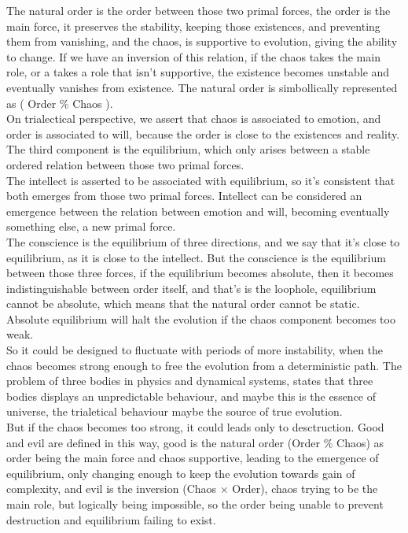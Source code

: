 \documentclass[12pt,a4paper]{article}
\begin{document}
The natural order is the order between those two primal forces, the order is the main force, it preserves the stability, keeping those existences, and preventing them from vanishing, and the chaos, is supportive to evolution, giving the ability to change. If we have an inversion of this relation, if the chaos takes the main role, or a takes a role that isn't supportive, the existence becomes unstable and eventually vanishes from existence. The natural order is simbollically represented as ( Order \% Chaos ). \\

On trialectical perspective, we assert that chaos is associated to emotion, and order is associated to will, because the order is close to the existences and reality. The third component is the equilibrium, which only arises between a stable ordered relation between those two primal forces. \\

The intellect is asserted to be associated with equilibrium, so it's consistent that both emerges from those two primal forces. Intellect can be considered an emergence between the relation between emotion and will, becoming eventually something else, a new primal force.\\

The conscience is the equilibrium of three directions, and we say that it's close to equilibrium, as it is close to the intellect. But the conscience is the equilibrium between those three forces, if the equilibrium becomes absolute, then it becomes indistinguishable between order itself, and that's is the loophole, equilibrium cannot be absolute, which means that the natural order cannot be static. Absolute equilibrium will halt the evolution if the chaos component becomes too weak. \\ 

So it could be designed to fluctuate with periods of more instability, when the chaos becomes strong enough to free the evolution from a deterministic path. The problem of three bodies in physics and dynamical systems, states that three bodies displays an unpredictable behaviour, and maybe this is the essence of universe, the trialetical behaviour maybe the source of true evolution.\\

But if the chaos becomes too strong, it could leads only to desctruction. Good and evil are defined in this way, good is the natural order (Order \% Chaos) as order being the main force and chaos supportive, leading to the emergence of equilibrium, only changing enough to keep the evolution towards gain of complexity, and evil is the inversion (Chaos $\times$ Order), chaos trying to be the main role, but logically being impossible, so the order being unable to prevent destruction and equilibrium failing to exist.\\
\end{document}
